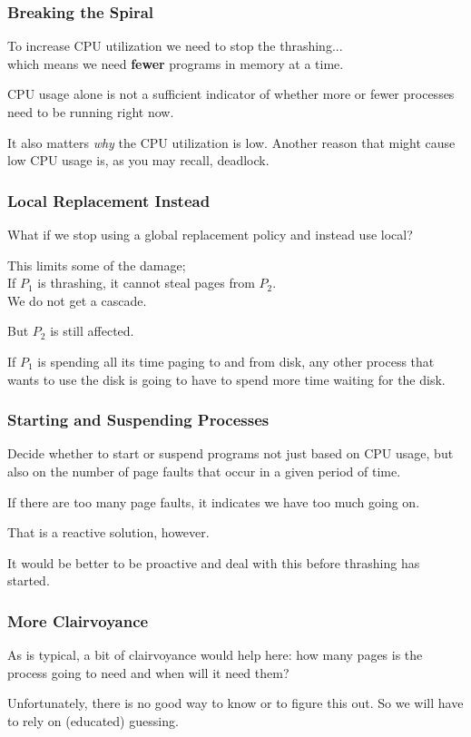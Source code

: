 \begin{frame}
\frametitle{Breaking the Spiral}

To increase CPU utilization we need to stop the thrashing...\\
\quad which means we need \textbf{fewer} programs in memory at a time. 

CPU usage alone is not a sufficient indicator of whether more or fewer processes need to be running right now. 

It also matters \textit{why} the CPU utilization is low. Another reason that might cause low CPU usage is, as you may recall, deadlock. 


\end{frame}

\begin{frame}
\frametitle{Local Replacement Instead}

What if we stop using a global replacement policy and instead use local? 

This limits some of the damage;\\
\quad If $P_{1}$ is thrashing, it cannot steal pages from $P_{2}$.\\
\quad We do not get a cascade.

But $P_{2}$ is still affected.

If $P_{1}$ is spending all its time paging to and from disk, any other process that wants to use the disk is going to have to spend more time waiting for the disk.


\end{frame}

\begin{frame}
\frametitle{Starting and Suspending Processes}

Decide whether to start or suspend programs not just based on CPU usage, but also on the number of page faults that occur in a given period of time. 

If there are too many page faults, it indicates we have too much going on. 

That is a reactive solution, however. 

It would be better to be proactive and deal with this before thrashing has started.


\end{frame}

\begin{frame}
\frametitle{More Clairvoyance}

As is typical, a bit of clairvoyance would help here: how many pages is the process going to need and when will it need them? 

Unfortunately, there is no good way to know or to figure this out. So we will have to rely on (educated) guessing.

\end{frame}

